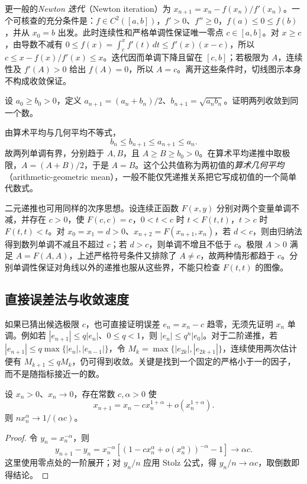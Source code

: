 更一般的\emph{Newton 迭代}（Newton iteration）为 $x_{n+1}=x_n-f(x_n)/f'(x_n)$。一个可核查的充分条件是：$f\in C^2([a,b])$，$f'>0$、$f''\ge0$，$f(a)\le0\le f(b)$，并从 $x_0=b$ 出发。此时连续性和严格单调性保证唯一零点 $c\in[a,b]$。对 $x\ge c$，由导数不减有 $0\le f(x)=\int_c^xf'(t)\,dt\le f'(x)(x-c)$，所以 $c\le x-f(x)/f'(x)\le x$。迭代因而单调下降且留在 $[c,b]$；若极限为 $A$，连续性及 $f'(A)>0$ 给出 $f(A)=0$，所以 $A=c$。离开这些条件时，切线图示本身不构成收敛保证。

\begin{example}
\label{ex:pei-agm-recursion}
设 $a_0\ge b_0>0$，定义 $a_{n+1}=(a_n+b_n)/2$、$b_{n+1}=\sqrt{a_nb_n}$。证明两列收敛到同一个数。
\end{example}
\begin{solve}
由算术平均与几何平均不等式，
\[
    b_n\le b_{n+1}\le a_{n+1}\le a_n.
\]
故两列单调有界，分别趋于 $A,B$，且 $A\ge B\ge b_0>0$。在算术平均递推中取极限，$A=(A+B)/2$，于是 $A=B$。这个公共值称为两初值的\emph{算术几何平均}（arithmetic-geometric mean），一般不能仅凭递推关系把它写成初值的一个简单代数式。
\end{solve}

二元递推也可用同样的次序思想。设连续正函数 $F(x,y)$ 分别对两个变量单调不减，并存在 $c>0$，使 $F(c,c)=c$，$0<t<c$ 时 $t<F(t,t)$，$t>c$ 时 $F(t,t)<t$。对 $x_0=x_1=d>0$、$x_{n+2}=F(x_{n+1},x_n)$，若 $d<c$，则由归纳法得到数列单调不减且不超过 $c$；若 $d>c$，则单调不增且不低于 $c$。极限 $A>0$ 满足 $A=F(A,A)$，上述严格符号条件又排除了 $A\ne c$，故两种情形都趋于 $c$。分别单调性保证对角线以外的递推也服从这些界，不能只检查 $F(t,t)$ 的图像。

\subsection{直接误差法与收敛速度}

如果已猜出候选极限 $c$，也可直接证明误差 $e_n=x_n-c$ 趋零，无须先证明 $x_n$ 单调。例如若 $|e_{n+1}|\le q|e_n|$、$0\le q<1$，则 $|e_n|\le q^n|e_0|$。对于二阶递推，若 $|e_{n+1}|\le q\max\{|e_n|,|e_{n-1}|\}$，令 $M_k=\max\{|e_{2k}|,|e_{2k+1}|\}$，连续使用两次估计便有 $M_{k+1}\le qM_k$，仍可得到收敛。关键是找到一个固定的严格小于一的因子，而不是随指标接近一的数。

\begin{proposition}[趋零递推的渐近速度]
\label{prop:pei-recursion-rate}
设 $x_n>0$、$x_n\to0$，存在常数 $c,\alpha>0$ 使
\[
    x_{n+1}=x_n-cx_n^{1+\alpha}+o(x_n^{1+\alpha}).
\]
则 $n x_n^\alpha\to1/(\alpha c)$。
\end{proposition}
\begin{proof}
令 $y_n=x_n^{-\alpha}$，则
\[
    y_{n+1}-y_n
    =x_n^{-\alpha}\left[
       (1-cx_n^\alpha+o(x_n^\alpha))^{-\alpha}-1\right]
    \longrightarrow\alpha c.
\]
这里使用零点处的一阶展开；对 $y_n/n$ 应用 Stolz 公式，得 $y_n/n\to\alpha c$，取倒数即得结论。
\end{proof}

